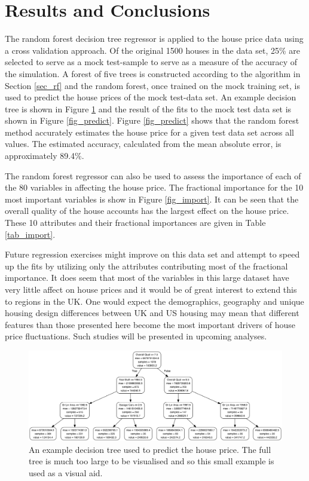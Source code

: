 \documentclass[10pt]{article}
\begin{document}
\section{Results and Conclusions}
The random forest decision tree regressor is applied to the house price data using a cross validation approach. Of the original 1500 houses in the data set, 25\% are selected to serve as a mock test-sample to serve as a measure of the accuracy of the simulation. A forest of five trees is constructed according to the algorithm in Section \ref{sec_rf} and the random forest, once trained on the mock training set, is used to predict the house prices of the mock test-data set. An example decision tree is shown in Figure \ref{fig_smalltree} and the result of the fits to the mock test data set is shown in Figure \ref{fig_predict}. Figure \ref{fig_predict} shows that the random forest method accurately estimates the house price for a given test data set across all values. The estimated accuracy, calculated from the mean absolute error, is approximately 89.4\%. 

The random forest regressor can also be used to assess the importance of each of the 80 variables in affecting the house price. The fractional importance for the 10 most important variables is show in Figure \ref{fig_import}. It can be seen that the overall quality of the house accounts has the largest effect on the house price. These 10 attributes and their fractional importances are given in Table \ref{tab_import}. 



Future regression exercises might improve on this data set and attempt to speed up the fits by utilizing only the attributes contributing most of the fractional importance. It does seem that most of the variables in this large dataset have very little affect on house prices and it would be of great interest to extend this to regions in the UK. One would expect the demographics, geography and unique housing design differences between UK and US housing may mean that different features than those presented here become the most important drivers of house price fluctuations. Such studies will be presented in upcoming analyses.


\begin{figure}
\begin{center}
\includegraphics[scale=0.4,angle=0,trim=8cm 0cm 0cm 2cm]{small_tree_0_0.png}
\caption{An example decision tree used to predict the house price. The full tree is much too large to be visualised and so this small example is used as a visual aid.}
\label{fig_smalltree}
\end{center}
\end{figure} 
\end{document}
